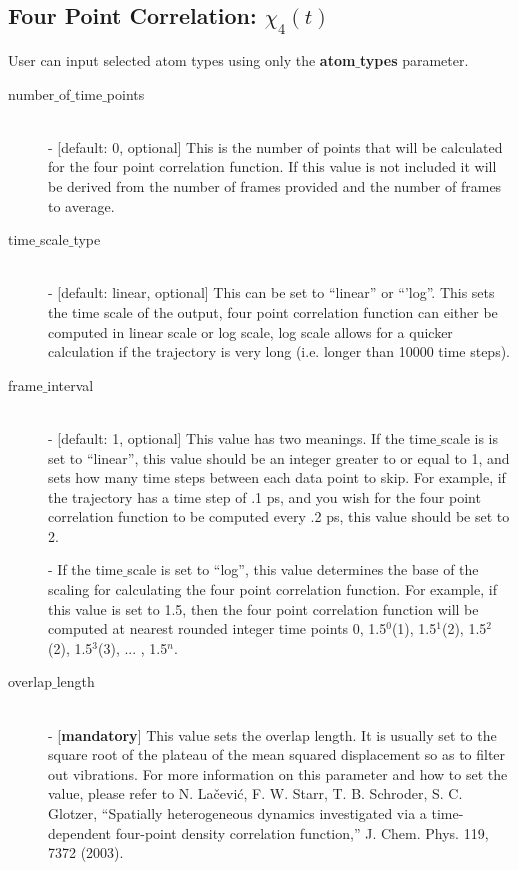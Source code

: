 \documentclass{article}
\begin{document}
\subsection{Four Point Correlation: $\chi_4(t)$} \label{sec::chi4_parm}
User can input selected atom types using only the \textbf{atom$\_$types} parameter.
\begin{description}	
	\item[number$\_$of$\_$time$\_$points]\hfill \\
	- [default: 0, optional] This is the number of points that will be calculated for the four point correlation function.  If this value is not included it will be derived from the number of frames provided and the number of frames to average.
	
	\item[time$\_$scale$\_$type] \hfill \\
	- [default: linear, optional] This can be set to ``linear'' or ``'log''.  This sets the time scale of the output, four point correlation function can either be computed in linear scale or log scale, log scale allows for a quicker calculation if the trajectory is very long (i.e. longer than 10000 time steps).
	
	\item[frame$\_$interval] \hfill \\
	- [default: 1, optional] This value has two meanings.  If the time$\_$scale is is set to ``linear'', this value should be an integer greater to or equal to 1, and sets how many time steps between each data point to skip.  For example, if the trajectory has a time step of .1 ps, and you wish for the four point correlation function to be computed every .2 ps, this value should be set to 2. 
	
	- If the time$\_$scale is set to ``log'', this value determines the base of the scaling for calculating the four point correlation function.  For example, if this value is set to 1.5, then the four point correlation function will be computed at nearest rounded integer time points 0, 1.5$^0$(1), 1.5$^1$(2), 1.5$^2$(2), 1.5$^3$(3), ... , 1.5$^{n}$.
	
	\item[overlap$\_$length] \hfill \\
	- [\textbf{mandatory}] This value sets the overlap length. It is usually set to the square root of the plateau of the mean squared displacement so as to filter out vibrations. For more information on this parameter and how to set the value, please refer to N. Lačević, F. W. Starr, T. B. Schroder, S. C. Glotzer, ``Spatially heterogeneous dynamics investigated via a time-dependent four-point density correlation function,'' J. Chem. Phys. 119, 7372 (2003).
\end{description}
\end{document}
